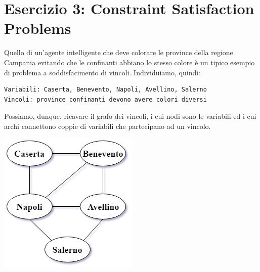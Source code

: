 	\section{Esercizio 3: Constraint Satisfaction Problems}
		\label{sec:es3}
		Quello di un'agente intelligente che deve colorare le province della regione Campania evitando che le confinanti abbiano lo stesso colore è un tipico esempio di problema a soddisfacimento di vincoli. Individuiamo, quindi:
		\begin{lstlisting}
Variabili: Caserta, Benevento, Napoli, Avellino, Salerno
Vincoli: province confinanti devono avere colori diversi
		\end{lstlisting}
		Possiamo, dunque, ricavare il grafo dei vincoli, i cui nodi sono le variabili ed i cui archi connettono coppie di variabili che partecipano ad un vincolo.
		\begin{center}
			\includegraphics[scale=0.7]{ConstraintGraph.jpg}
		\end{center}
		
